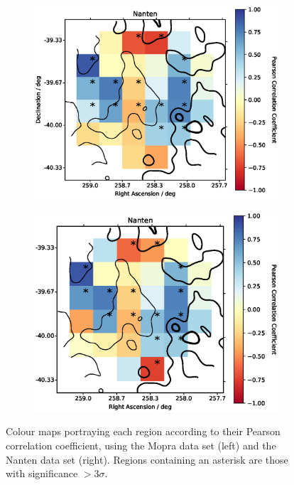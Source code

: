 \documentclass[12pt,a4paper]{article}
\begin{document}
\begin{figure}[h]
\begin{subfigure}{0.5\textwidth}
		\includegraphics[width=1.00\linewidth, height=0.25\textheight]{pearsonmap_gam_nanHI}
		\label{fig:corsigmap}
	\end{subfigure}
	\begin{subfigure}{0.5\textwidth}
		\centering
		\includegraphics[width=1.00\linewidth, height=0.25\textheight]{pearsonmap_gam_nanHI_trimmed}
		\label{fig:wpratiomap}
	\end{subfigure}
	\caption{Colour maps portraying each region according to their Pearson correlation coefficient, using the Mopra data set (left) and the Nanten data set (right). Regions containing an asterisk are those with significance $>3 \sigma$.}
	\label{fig:pearson gamgas map}
\end{figure}
\end{document}

